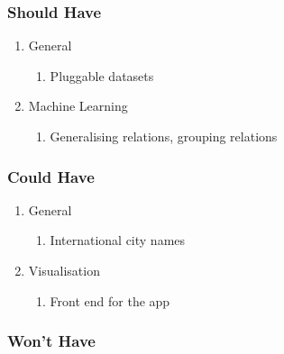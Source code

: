 \subsubsection {Should Have}

\begin{enumerate}
    \item{General}
    \begin{enumerate}
        \item Pluggable datasets
    \end{enumerate}
    
    \item{Machine Learning}  
    \begin{enumerate}
        \item Generalising relations, grouping relations
    \end{enumerate}
\end{enumerate}


\subsubsection {Could Have}

\begin{enumerate}
    \item{General}
    \begin{enumerate}
        \item International city names
    \end{enumerate}
    
    \item{Visualisation}    
    \begin{enumerate}
        \item Front end for the app
    \end{enumerate}
\end{enumerate}

\subsubsection {Won't Have}